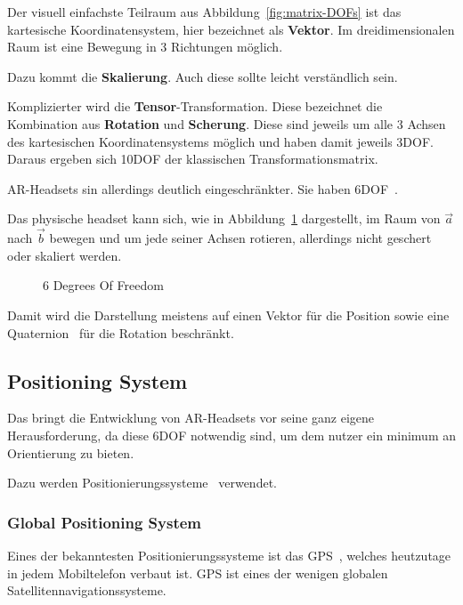 Der visuell einfachste Teilraum aus Abbildung~\ref{fig:matrix-DOFs} ist das kartesische Koordinatensystem, hier bezeichnet als \textbf{Vektor}.
Im dreidimensionalen Raum ist eine Bewegung in 3 Richtungen möglich.

Dazu kommt die \textbf{Skalierung}.
Auch diese sollte leicht verständlich sein.

Komplizierter wird die \textbf{Tensor}-Transformation.
Diese bezeichnet die Kombination aus \textbf{Rotation} und \textbf{Scherung}.
Diese sind jeweils um alle 3 Achsen des kartesischen Koordinatensystems möglich und haben damit jeweils 3DOF\@.
Daraus ergeben sich 10DOF der klassischen Transformationsmatrix.

AR-Headsets sin allerdings deutlich eingeschränkter.
Sie haben 6DOF~\autocite{wikipedia-contributors-2023B}.

Das physische headset kann sich, wie in Abbildung~\ref{fig:6DOF} dargestellt, im Raum von $\vec{a}$ nach $\vec{b}$ bewegen und um jede seiner Achsen rotieren, allerdings nicht geschert oder skaliert werden.
\begin{figure}[ht!]
    \label{fig:6DOF}
    \center
    
    \caption{6 Degrees Of Freedom~\autocite{wikipedia-contributors-2023B}}
\end{figure}
Damit wird die Darstellung meistens auf einen Vektor für die Position sowie eine Quaternion~\autocite{wikipedia-contributors-2023G} für die Rotation beschränkt.

\subsection{Positioning System}\label{subsec:positioning-system}
Das bringt die Entwicklung von AR-Headsets vor seine ganz eigene Herausforderung, da diese 6DOF notwendig sind, um dem nutzer ein minimum an Orientierung zu bieten.

Dazu werden Positionierungssysteme~\autocite{wikipedia-contributors-2023A} verwendet.

\subsubsection{Global Positioning System}\label{subsubsec:global-positioning-system}
Eines der bekanntesten Positionierungssysteme ist das GPS~\autocite{wikipedia-contributors-2023J}, welches heutzutage in jedem Mobiltelefon verbaut ist.
GPS ist eines der wenigen globalen Satellitennavigationssysteme.


